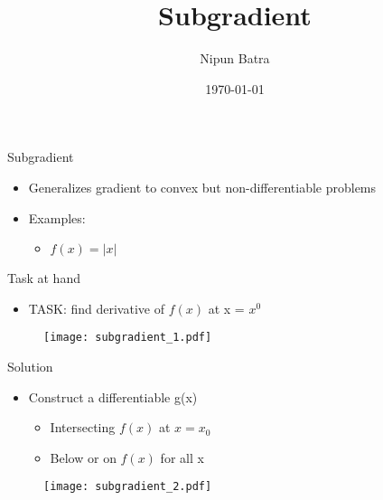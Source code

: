 \documentclass{beamer}
\title{Subgradient}
\date{\today}
\author{Nipun Batra}
\institute{IIT Gandhinagar}
\begin{document}
  \maketitle
  
  
  

\begin{frame}{Subgradient }
\begin{itemize}
	
	
	\item Generalizes gradient to convex but non-differentiable problems
	\item Examples:
	\begin{itemize}
		\item $f(x) = |x|$
	\end{itemize}
	
\end{itemize}
\end{frame}

\begin{frame}{Task at hand}
\begin{itemize}

\item TASK: find derivative of $f(x)$ at x = $x^0$
\end{itemize}
\begin{figure}
    \centering
    \texttt{[image: subgradient\_1.pdf]}
    
    \label{fig:Non-differentiable function}
\end{figure}
	

\end{frame}

\begin{frame}{Solution}

\begin{itemize}
\item Construct a differentiable g(x) 
\begin{itemize}
    \item Intersecting $f(x)$ at $x = x_0$
    \item Below or on $f(x)$ for all x
\end{itemize}
\end{itemize}
\begin{figure}
    \centering
    \texttt{[image: subgradient\_2.pdf]}
    \label{fig:my_label}
\end{figure}
\end{frame}
\end{document}
